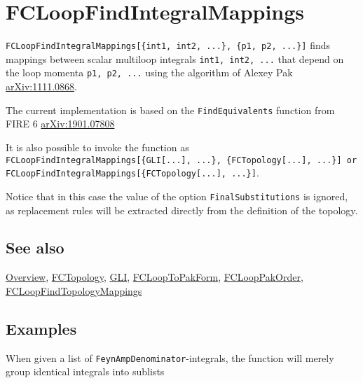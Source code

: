 \documentclass[../FeynCalcManual.tex]{subfiles}
\begin{document}
\hypertarget{fcloopfindintegralmappings}{%
\section{FCLoopFindIntegralMappings}\label{fcloopfindintegralmappings}}

\texttt{FCLoopFindIntegralMappings[\allowbreak{}\{\allowbreak{}int1,\ \allowbreak{}int2,\ \allowbreak{}...\},\ \allowbreak{}\{\allowbreak{}p1,\ \allowbreak{}p2,\ \allowbreak{}...\}]}
finds mappings between scalar multiloop integrals
\texttt{int1,\ \allowbreak{}int2,\ \allowbreak{}...} that depend on the
loop momenta \texttt{p1,\ \allowbreak{}p2,\ \allowbreak{}...} using the
algorithm of Alexey Pak
\href{https://arxiv.org/abs/1111.0868}{arXiv:1111.0868}.

The current implementation is based on the \texttt{FindEquivalents}
function from FIRE 6
\href{https://arxiv.org/abs/1901.07808}{arXiv:1901.07808}

It is also possible to invoke the function as
\texttt{FCLoopFindIntegralMappings[\allowbreak{}\{\allowbreak{}GLI[\allowbreak{}...],\ \allowbreak{}...\},\ \allowbreak{}\{\allowbreak{}FCTopology[\allowbreak{}...],\ \allowbreak{}...\}] or FCLoopFindIntegralMappings[\allowbreak{}\{\allowbreak{}FCTopology[\allowbreak{}...],\ \allowbreak{}...\}]}.

Notice that in this case the value of the option
\texttt{FinalSubstitutions} is ignored, as replacement rules will be
extracted directly from the definition of the topology.

\subsection{See also}

\hyperlink{toc}{Overview}, \hyperlink{fctopology}{FCTopology},
\hyperlink{gli}{GLI}, \hyperlink{fclooptopakform}{FCLoopToPakForm},
\hyperlink{fclooppakorder}{FCLoopPakOrder},
\hyperlink{fcloopfindtopologymappings}{FCLoopFindTopologyMappings}

\subsection{Examples}

When given a list of \texttt{FeynAmpDenominator}-integrals, the function
will merely group identical integrals into sublists

\begin{Shaded}
\begin{Highlighting}[]
\ExtensionTok{=} \OperatorTok{\{}\OperatorTok{[\{}\OperatorTok{,}\OperatorTok{\}],}\OperatorTok{[\{}\SpecialCharTok{+} \OperatorTok{,}\OperatorTok{\}],}\OperatorTok{[\{}\OperatorTok{,}\OperatorTok{\}]\}}
\end{Highlighting}
\end{Shaded}
\end{document}

